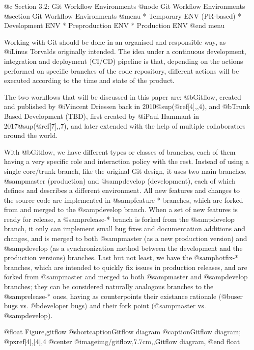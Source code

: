 @c Section 3.2: Git Workflow Environments
@node Git Workflow Environments
@section Git Workflow Environments
@menu
* Temporary ENV (PR-based)
* Development ENV
* Preproduction ENV
* Production ENV
@end menu

Working with Git should be done in an organised and responsible way, as @i{Linus Torvalds} originally intended. The idea under a continuous development, integration and deployment (CI/CD) pipeline is that, depending on the actions performed on specific branches of the code repository, different actions will be executed according to the time and state of the product.

The two workflows that will be discussed in this paper are: @b{Gitflow}, created and published by @i{Vincent Driessen} back in 2010@sup{(@ref{[4],,4})}, and @b{Trunk Based Development (TBD)}, first created by @i{Paul Hammant} in 2017@sup{(@ref{[7],,7})}, and later extended with the help of multiple collaborators around the world.

With @b{Gitflow}, we have different types or classes of branches, each of them having a very specific role and interaction policy with the rest. Instead of using a single core/trunk branch, like the original Git design, it uses two main branches, @samp{master} (production) and @samp{develop} (development), each of which defines and describes a different environment. All new features and changes to the source code are implemented in @samp{feature-*} branches, which are forked from and merged to the @samp{develop} branch. When a set of new features is ready for release, a @samp{release-*} branch is forked from the @samp{develop} branch, it only can implement small bug fixes and documentation additions and changes, and is merged to both @samp{master} (as a new production version) and @samp{develop} (as a synchronization method between the development and the production versions) branches. Last but not least, we have the @samp{hotfix-*} branches, which are intended to quickly fix issues in production releases, and are forked from @samp{master} and merged to both @samp{master} and @samp{develop} branches; they can be considered naturally analogous branches to the @samp{release-*} ones, having as counterpoints their existance rationale (@b{user bugs} vs. @b{developer bugs}) and their fork point (@samp{master} vs. @samp{develop}).

@float Figure,gitflow
@shortcaption{Gitflow diagram}
@caption{Gitflow diagram; @pxref{[4],[4],4}}
@center @image{img/gitflow,7.7cm,,Gitflow diagram,}
@end float

